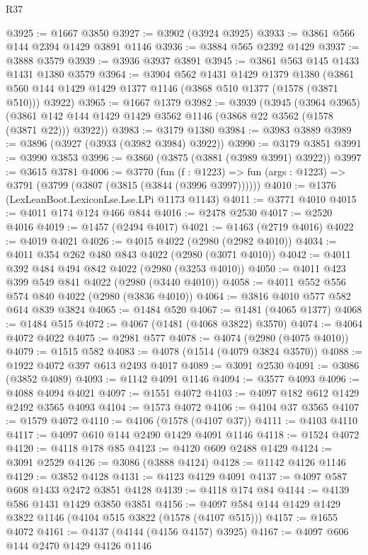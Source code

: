 \begin{lexlean}{R37}
\begin{coremodule}
@3925 := @1667 @3850
@3927 := @3902 (@3924 @3925)
@3933 := @3861 @566 @144 @2394 @1429 @3891 @1146
@3936 := @3884 @565 @2392 @1429
@3937 := @3888 @3579
@3939 := @3936 @3937 @3891
@3945 := @3861 @563 @145 @1433 @1431 @1380 @3579
@3964 := @3904
    @562
    @1431
    @1429
    @1379
    @1380
    (@3861 @560 @144 @1429 @1429 @1377 @1146 (@3868 @510 @1377 (@1578 (@3871 @510))) @3922)
@3965 := @1667 @1379
@3982 := @3939
    (@3945
      (@3964 @3965)
      (@3861 @142 @144 @1429 @1429 @3562 @1146 (@3868 @22 @3562 (@1578 (@3871 @22))) @3922))
@3983 := @3179 @1380
@3984 := @3983 @3889
@3989 := @3896 (@3927 (@3933 (@3982 @3984) @3922))
@3990 := @3179 @3851
@3991 := @3990 @3853
@3996 := @3860 (@3875 (@3881 (@3989 @3991) @3922))
@3997 := @3615 @3781
@4006 := @3770
    (fun (f : @1223) => fun (args : @1223) => @3791 (@3799 (@3807 (@3815 (@3844 (@3996 @3997))))))
@4010 := @1376 (LexLeanBoot.LexiconLse.Lse.LPi @1173 @1143)
@4011 := @3771 @4010
@4015 := @4011 @174 @124 @466 @844
@4016 := @2478 @2530
@4017 := @2520 @4016
@4019 := @1457 (@2494 @4017)
@4021 := @1463 (@2719 @4016)
@4022 := @4019 @4021
@4026 := @4015 @4022 (@2980 (@2982 @4010))
@4034 := @4011 @354 @262 @480 @843 @4022 (@2980 (@3071 @4010))
@4042 := @4011 @392 @484 @494 @842 @4022 (@2980 (@3253 @4010))
@4050 := @4011 @423 @399 @549 @841 @4022 (@2980 (@3440 @4010))
@4058 := @4011 @552 @556 @574 @840 @4022 (@2980 (@3836 @4010))
@4064 := @3816 @4010 @577 @582 @614 @839 @3824
@4065 := @1484 @520
@4067 := @1481 (@4065 @1377)
@4068 := @1484 @515
@4072 := @4067 (@1481 (@4068 @3822) @3570)
@4074 := @4064 @4072 @4022
@4075 := @2981 @577
@4078 := @4074 (@2980 (@4075 @4010))
@4079 := @1515 @582
@4083 := @4078 (@1514 (@4079 @3824 @3570))
@4088 := @1922 @4072 @397 @613 @2493 @4017
@4089 := @3091 @2530
@4091 := @3086 (@3852 @4089)
@4093 := @1142 @4091 @1146
@4094 := @3577 @4093
@4096 := @4088 @4094 @4021
@4097 := @1551 @4072
@4103 := @4097 @182 @612 @1429 @2492 @3565 @4093
@4104 := @1573 @4072
@4106 := @4104 @37 @3565
@4107 := @1579 @4072
@4110 := @4106 (@1578 (@4107 @37))
@4111 := @4103 @4110
@4117 := @4097 @610 @144 @2490 @1429 @4091 @1146
@4118 := @1524 @4072
@4120 := @4118 @178 @85
@4123 := @4120 @609 @2488 @1429
@4124 := @3091 @2529
@4126 := @3086 (@3888 @4124)
@4128 := @1142 @4126 @1146
@4129 := @3852 @4128
@4131 := @4123 @4129 @4091
@4137 := @4097 @587 @608 @1433 @2472 @3851 @4128
@4139 := @4118 @174 @84
@4144 := @4139 @586 @1431 @1429 @3850 @3851
@4156 := @4097 @584 @144 @1429 @1429 @3822 @1146 (@4104 @515 @3822 (@1578 (@4107 @515)))
@4157 := @1655 @4072
@4161 := @4137 (@4144 (@4156 @4157) @3925)
@4167 := @4097 @606 @144 @2470 @1429 @4126 @1146

\end{coremodule}
\end{lexlean}
